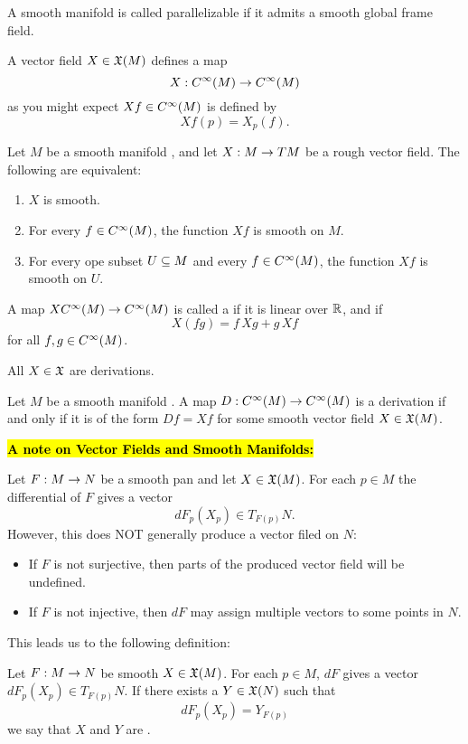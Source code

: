 \dfn A smooth manifold is called parallelizable if it admits a smooth global frame field.

\nb A vector field $X\in \mathfrak{X}(M)$ defines a map
\[X:C^\infty(M)\rightarrow C^\infty(M)\]
as you might expect $Xf\in C^\infty(M)$ is defined by
\[Xf(p) = X_p(f).\]

\setcounter{thm}{13}

\begin{prop}
Let $M$ be a smooth manifold \wowob, and let $X:M\rightarrow TM$ be a rough vector field. The following are equivalent:
\begin{enumerate}
    \item $X$ is smooth.
    \item For every $f\in C^\infty(M)$, the function $Xf$ is smooth on $M$.
    \item For every ope subset $U\subseteq M$ and every $f\in C^\infty(M)$, the function $Xf$ is smooth on $U$.
\end{enumerate}
\end{prop}

\dfn A map $XC^\infty(M)\rightarrow C^\infty(M)$ is called a  if it is linear over $\mathbb{R}$, and if
\[X(fg) = f\,Xg + g\,Xf\]
for all $f,g\in C^\infty(M)$.

\nb All $X\in \mathfrak{X}$ are derivations.

\begin{prop}
Let $M$ be a smooth manifold \wowob. A map $D:C^\infty(M)\rightarrow C^\infty(M)$ is a derivation if and only if it is of the form $Df = Xf$ for some smooth vector field $X\in \mathfrak{X}(M)$.
\end{prop}


\vs\hl{\textbf{A note on Vector Fields and Smooth Manifolds:}}

Let $F:M\rightarrow N$ be a smooth pan and let $X\in \mathfrak{X}(M)$. For each $p\in M$ the differential of $F$ gives a vector
\[dF_p(X_p)\in T_{F(p)}N.\]
However, this does NOT generally produce a vector filed on $N$:
\begin{itemize}
    \item If $F$ is not surjective, then parts of the produced vector field will be undefined.
    \item If $F$ is not injective, then $dF$ may assign multiple vectors to some points in $N$.
\end{itemize}
This leads us to the following definition:

\dfn Let $F:M\rightarrow N$ be smooth $X\in \mathfrak{X}(M)$. For each $p\in M$, $dF$ gives a vector $dF_p(X_p)\in T_{F(p)}N$. If there exists a $Y\in \mathfrak{X}(N)$ such that
\[dF_p(X_p) = Y_{F(p)}\]
we say that $X$ and $Y$ are .

